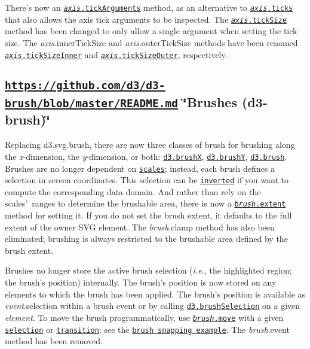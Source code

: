 There’s now an \href{https://github.com/d3/d3-axis/blob/master/README.md#axis_tickArguments}{\tt {\itshape axis}.tick\+Arguments} method, as an alternative to \href{https://github.com/d3/d3-axis/blob/master/README.md#axis_ticks}{\tt {\itshape axis}.ticks} that also allows the axis tick arguments to be inspected. The \href{https://github.com/d3/d3-axis/blob/master/README.md#axis_tickSize}{\tt {\itshape axis}.tick\+Size} method has been changed to only allow a single argument when setting the tick size. The {\itshape axis}.inner\+Tick\+Size and {\itshape axis}.outer\+Tick\+Size methods have been renamed \href{https://github.com/d3/d3-axis/blob/master/README.md#axis_tickSizeInner}{\tt {\itshape axis}.tick\+Size\+Inner} and \href{https://github.com/d3/d3-axis/blob/master/README.md#axis_tickSizeOuter}{\tt {\itshape axis}.tick\+Size\+Outer}, respectively.

\subsection*{\href{https://github.com/d3/d3-brush/blob/master/README.md}{\tt https\+://github.\+com/d3/d3-\/brush/blob/master/\+R\+E\+A\+D\+M\+E.\+md} \char`\"{}\+Brushes (d3-\/brush)\char`\"{}}

Replacing d3.\+svg.\+brush, there are now three classes of brush for brushing along the {\itshape x}-\/dimension, the {\itshape y}-\/dimension, or both\+: \href{https://github.com/d3/d3-brush/blob/master/README.md#brushX}{\tt d3.\+brushX}, \href{https://github.com/d3/d3-brush/blob/master/README.md#brushY}{\tt d3.\+brushY}, \href{https://github.com/d3/d3-brush/blob/master/README.md#brush}{\tt d3.\+brush}. Brushes are no longer dependent on \href{#scales-d3-scale}{\tt scales}; instead, each brush defines a selection in screen coordinates. This selection can be \href{https://github.com/d3/d3-scale/blob/master/README.md#continuous_invert}{\tt inverted} if you want to compute the corresponding data domain. And rather than rely on the scales’ ranges to determine the brushable area, there is now a \href{https://github.com/d3/d3-brush/blob/master/README.md#brush_extent}{\tt {\itshape brush}.extent} method for setting it. If you do not set the brush extent, it defaults to the full extent of the owner S\+VG element. The {\itshape brush}.clamp method has also been eliminated; brushing is always restricted to the brushable area defined by the brush extent.

Brushes no longer store the active brush selection ({\itshape i.\+e.}, the highlighted region; the brush’s position) internally. The brush’s position is now stored on any elements to which the brush has been applied. The brush’s position is available as {\itshape event}.selection within a brush event or by calling \href{https://github.com/d3/d3-brush/blob/master/README.md#brushSelection}{\tt d3.\+brush\+Selection} on a given {\itshape element}. To move the brush programmatically, use \href{https://github.com/d3/d3-brush/blob/master/README.md#brush_move}{\tt {\itshape brush}.move} with a given \href{#selections-d3-selection}{\tt selection} or \href{#transitions-d3-transition}{\tt transition}; see the \href{https://bl.ocks.org/mbostock/6232537}{\tt brush snapping example}. The {\itshape brush}.event method has been removed.

